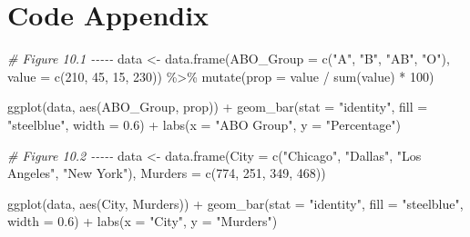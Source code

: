 \documentclass[
]{book}
\newenvironment{Shaded}{\begin{snugshade}}{\end{snugshade}}
\newcommand{\AttributeTok}[1]{\textcolor[rgb]{0.77,0.63,0.00}{#1}}
\newcommand{\CommentTok}[1]{\textcolor[rgb]{0.56,0.35,0.01}{\textit{#1}}}
\newcommand{\DecValTok}[1]{\textcolor[rgb]{0.00,0.00,0.81}{#1}}
\newcommand{\FloatTok}[1]{\textcolor[rgb]{0.00,0.00,0.81}{#1}}
\newcommand{\FunctionTok}[1]{\textcolor[rgb]{0.00,0.00,0.00}{#1}}
\newcommand{\NormalTok}[1]{#1}
\newcommand{\OtherTok}[1]{\textcolor[rgb]{0.56,0.35,0.01}{#1}}
\newcommand{\SpecialCharTok}[1]{\textcolor[rgb]{0.00,0.00,0.00}{#1}}
\newcommand{\StringTok}[1]{\textcolor[rgb]{0.31,0.60,0.02}{#1}}
\begin{document}
\hypertarget{code-appendix-3}{%
\section{Code Appendix}\label{code-appendix-3}}

\begin{Shaded}
\begin{Highlighting}[]
\CommentTok{\# Figure 10.1 {-}{-}{-}{-}{-}}
\NormalTok{data }\OtherTok{\textless{}{-}} \FunctionTok{data.frame}\NormalTok{(}\AttributeTok{ABO\_Group =} \FunctionTok{c}\NormalTok{(}\StringTok{"A"}\NormalTok{, }\StringTok{"B"}\NormalTok{, }\StringTok{"AB"}\NormalTok{, }\StringTok{"O"}\NormalTok{), }\AttributeTok{value =} \FunctionTok{c}\NormalTok{(}\DecValTok{210}\NormalTok{, }\DecValTok{45}\NormalTok{, }\DecValTok{15}\NormalTok{, }\DecValTok{230}\NormalTok{)) }\SpecialCharTok{\%\textgreater{}\%}
  \FunctionTok{mutate}\NormalTok{(}\AttributeTok{prop =}\NormalTok{ value }\SpecialCharTok{/} \FunctionTok{sum}\NormalTok{(value) }\SpecialCharTok{*} \DecValTok{100}\NormalTok{)}

\FunctionTok{ggplot}\NormalTok{(data, }\FunctionTok{aes}\NormalTok{(ABO\_Group, prop)) }\SpecialCharTok{+} 
  \FunctionTok{geom\_bar}\NormalTok{(}\AttributeTok{stat =} \StringTok{"identity"}\NormalTok{, }\AttributeTok{fill =} \StringTok{"steelblue"}\NormalTok{, }\AttributeTok{width =} \FloatTok{0.6}\NormalTok{) }\SpecialCharTok{+} 
  \FunctionTok{labs}\NormalTok{(}\AttributeTok{x =} \StringTok{"ABO Group"}\NormalTok{, }\AttributeTok{y =} \StringTok{"Percentage"}\NormalTok{)}

\CommentTok{\# Figure 10.2 {-}{-}{-}{-}{-}}
\NormalTok{data }\OtherTok{\textless{}{-}} \FunctionTok{data.frame}\NormalTok{(}\AttributeTok{City =} \FunctionTok{c}\NormalTok{(}\StringTok{"Chicago"}\NormalTok{, }\StringTok{"Dallas"}\NormalTok{, }\StringTok{"Los Angeles"}\NormalTok{, }\StringTok{"New York"}\NormalTok{), }
                   \AttributeTok{Murders =} \FunctionTok{c}\NormalTok{(}\DecValTok{774}\NormalTok{, }\DecValTok{251}\NormalTok{, }\DecValTok{349}\NormalTok{, }\DecValTok{468}\NormalTok{))}

\FunctionTok{ggplot}\NormalTok{(data, }\FunctionTok{aes}\NormalTok{(City, Murders)) }\SpecialCharTok{+} 
  \FunctionTok{geom\_bar}\NormalTok{(}\AttributeTok{stat =} \StringTok{"identity"}\NormalTok{, }\AttributeTok{fill =} \StringTok{"steelblue"}\NormalTok{, }\AttributeTok{width =} \FloatTok{0.6}\NormalTok{) }\SpecialCharTok{+} 
  \FunctionTok{labs}\NormalTok{(}\AttributeTok{x =} \StringTok{"City"}\NormalTok{, }\AttributeTok{y =} \StringTok{"Murders"}\NormalTok{)}


\end{Highlighting}
\end{Shaded}
\end{document}
